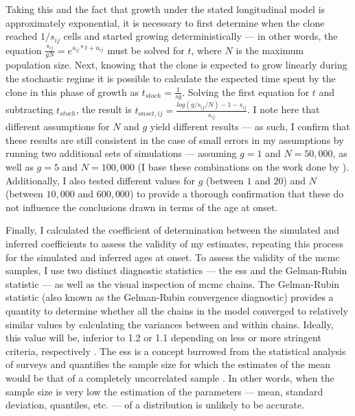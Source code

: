 Taking this and the fact that growth under the stated longitudinal model is approximately exponential, it is necessary to first determine when the clone reached $1/s_{ij}$ cells and started growing deterministically --- in other words, the equation $\frac{s_{ij}}{gN} = e^{s_{ij} * t + u_{ij}}$ must be solved for $t$, where $N$ is the maximum population size. Next, knowing that the clone is expected to grow linearly during the stochastic regime it is possible to calculate the expected time spent by the clone in this phase of growth as $t_{stoch} = \frac{1}{sg}$. Solving the first equation for $t$ and subtracting $t_{stoch}$, the result is $t_{onset,ij} = \frac{log(g/s_{ij}/N)-1-s_{ij}}{s_{ij}}$. I note here that different assumptions for $N$ and $g$ yield different results --- as such, I confirm that these results are still consistent in the case of small errors in my assumptions by running two additional sets of simulations --- assuming $g=1$ and $N=50,000$, as well as $g=5$ and $N=100,000$ (I base these combinations on the work done by  \cite{Lee-Six2018-lp}). Additionally, I also tested different values for $g$ (between $1$ and $20$) and $N$ (between $10,000$ and $600,000$) to provide a thorough confirmation that these do not influence the conclusions drawn in terms of the age at onset.

Finally, I calculated the coefficient of determination between the simulated and inferred coefficients to assess the validity of my estimates, repeating this process for the simulated and inferred ages at onset. To assess the validity of the \ac{mcmc} samples, I use two distinct diagnostic statistics --- the \ac{ess} and the Gelman-Rubin statistic \cite{Gelman1992-zo} --- as well as the visual inspection of \ac{mcmc} chains. The Gelman-Rubin statistic (also known as the Gelman-Rubin convergence diagnostic) provides a quantity to determine whether all the chains in the model converged to relatively similar values by calculating the variances between and within chains. Ideally, this value will be, inferior to 1.2 or 1.1 depending on less or more stringent criteria, respectively \cite{Brooks1998-jx}. The \ac{ess} is a concept burrowed from the statistical analysis of surveys and quantifies the sample size for which the estimates of the mean would be that of a completely uncorrelated sample \cite{Kish1965-ei}. In other words, when the sample size is very low the estimation of the parameters --- mean, standard deviation, quantiles, etc. --- of a distribution is unlikely to be accurate.

